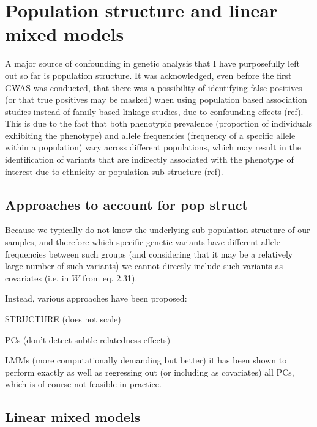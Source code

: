 

\section{Population structure and linear mixed models}

A major source of confounding in genetic analysis that I have purposefully left out so far is population structure.
It was acknowledged, even before the first GWAS was conducted, that there was a possibility of identifying false positives (or that true positives may be masked) when using population based association studies instead of family based linkage studies, due to confounding effects (ref). 
This is due to the fact that both phenotypic prevalence (proportion of individuals exhibiting the phenotype) and allele frequencies (frequency of a specific allele within a population) vary across different populations, which may result in the identification of variants that are indirectly associated with the phenotype of interest due to ethnicity or population sub-structure (ref).


\subsection{Approaches to account for pop struct}

Because we typically do not know the underlying sub-population structure of our samples, and therefore which specific genetic variants have different allele frequencies between such groups (and considering that it may be a relatively large number of such variants) we cannot directly include such variants as covariates (i.e. in $W$ from eq. 2.31).

Instead, various approaches have been proposed:

STRUCTURE (does not scale)

PCs (don't detect subtle relatedness effects)

LMMs (more computationally demanding but better)
it has been shown to perform exactly as well as regressing out (or including as covariates) all PCs, which is of course not feasible in practice. 

\subsection{Linear mixed models}


